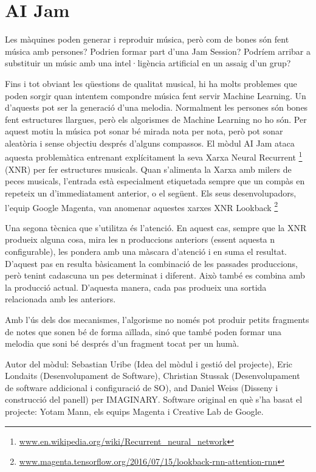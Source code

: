 \section{AI Jam}
Les màquines poden generar i reproduir música, però com de bones són fent música amb persones? Podrien formar part d'una Jam Session?
Podríem arribar a substituir un músic amb una intel·ligència artificial en un assaig d'un grup?

Fins i tot obviant les qüestions de qualitat musical, hi ha molts problemes que poden sorgir quan intentem compondre música fent servir Machine Learning. Un d'aquests pot ser la generació d'una melodia. Normalment les persones són bones fent estructures llargues, però els algorismes de Machine Learning no ho són. Per aquest motiu la música pot sonar bé mirada nota per nota, però pot sonar aleatòria i sense objectiu després d'alguns compassos. El mòdul AI Jam ataca aquesta problemàtica entrenant explícitament la seva Xarxa Neural Recurrent \footnote{\url{www.en.wikipedia.org/wiki/Recurrent_neural_network}} (XNR) per fer estructures musicals. Quan s'alimenta la Xarxa amb milers de peces musicals, l'entrada està especialment etiquetada sempre que un compàs en repeteix un d'immediatament anterior, o el següent. Els seus desenvolupadors, l'equip Google Magenta, van anomenar aquestes xarxes XNR Lookback \footnote{\url{www.magenta.tensorflow.org/2016/07/15/lookback-rnn-attention-rnn}}

Una segona tècnica que s'utilitza és l'atenció. En aquest cas, sempre que la XNR produeix alguna cosa, mira les n produccions anteriors (essent aquesta n configurable), les pondera amb una màscara d'atenció i en suma el resultat. D'aquest pas en resulta bàsicament la combinació de les passades produccions, però tenint cadascuna un pes determinat i diferent. Això també es combina amb la producció actual. D'aquesta manera, cada pas produeix una sortida relacionada amb les anteriors.

Amb l'ús dels dos mecanismes, l'algorisme no només pot produir petits fragments de notes que sonen bé de forma aïllada, sinó que també poden formar una melodia que soni bé després d'un fragment tocat per un humà.

\vfill

Autor del mòdul: Sebastian Uribe (Idea del mòdul i gestió del projecte), Eric Londaits (Desenvolupament de Software), Christian Stussak (Desenvolupament de software addicional i configuració de SO), and Daniel Weiss (Disseny i construcció del panell) per IMAGINARY.
Software original en què s'ha basat el projecte: Yotam Mann, els equips Magenta i Creative Lab de Google.
